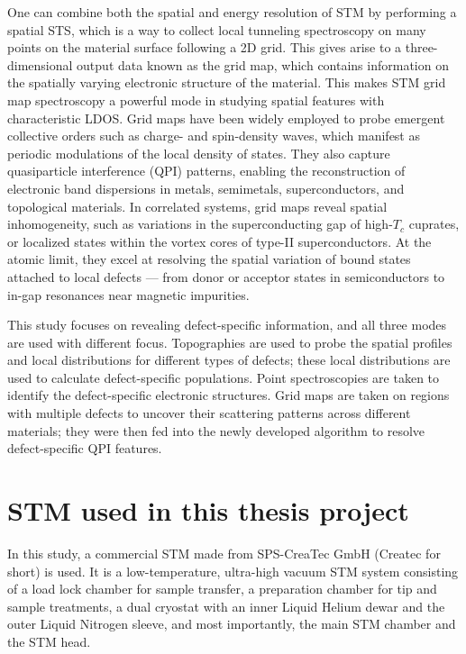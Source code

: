 One can combine both the spatial and energy resolution of \ac{STM} by performing a spatial \ac{STS}, which is a way to collect local tunneling spectroscopy on many points on the material surface following a 2D grid. This gives arise to a three-dimensional output data known as the grid map, which contains information on the spatially varying electronic structure of the material. This makes \ac{STM} grid map spectroscopy a powerful mode in studying spatial features with characteristic \ac{LDOS}. Grid maps have been widely employed to probe emergent collective orders such as charge- and spin-density waves, which manifest as periodic modulations of the local density of states. They also capture quasiparticle interference (QPI) patterns, enabling the reconstruction of electronic band dispersions in metals, semimetals, superconductors, and topological materials\cite{avrahamQuasiparticleInterferenceStudies2018}. In correlated systems, grid maps reveal spatial inhomogeneity, such as variations in the superconducting gap of high-$T_c$ cuprates\cite{duanSingleparticleTunnelingSpectroscopy2021}\cite{boyerImagingTwoGaps2007}, or localized states within the vortex cores of type-II superconductors\cite{panSTMStudiesElectronic2000}\cite{suderowImagingSuperconductingVortex2014}. At the atomic limit, they excel at resolving the spatial variation of bound states attached to local defects — from donor or acceptor states in semiconductors\cite{mahieuDirectEvidenceShallow2005} to in-gap resonances near magnetic impurities\cite{schneiderMagnetismIngapStates2019}\cite{yangIngapQuasiparticleExcitations2013}\cite{chatzopoulosSpatiallyDispersingYuShibaRusinov2021}.

This study focuses on revealing defect-specific information, and all three modes are used with different focus. Topographies are used to probe the spatial profiles and local distributions for different types of defects; these local distributions are used to calculate defect-specific populations. Point spectroscopies are taken to identify the defect-specific electronic structures. Grid maps are taken on regions with multiple defects to uncover their scattering patterns across different materials; they were then fed into the newly developed algorithm to resolve defect-specific \ac{QPI} features. 

\section{STM used in this thesis project}
In this study, a commercial STM made from SPS-CreaTec GmbH (Createc for short) is used. It is a low-temperature, ultra-high vacuum STM system consisting of a load lock chamber for sample transfer, a preparation chamber for tip and sample treatments, a dual cryostat with an inner Liquid Helium dewar and the outer Liquid Nitrogen sleeve, and most importantly, the main STM chamber and the STM head. 

